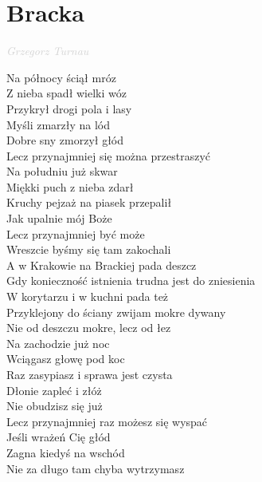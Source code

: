 \documentclass[a5paper, 10pt]{book}
\begin{document}
\section{Bracka}\textcolor{lightgray}{\textit{Grzegorz Turnau}}\\
\begin{minipage}[t]{0.8\textwidth}
Na północy ściął mróz\\
Z nieba spadł wielki wóz\\
Przykrył drogi pola i lasy\\
Myśli zmarzły na lód\\
Dobre sny zmorzył głód\\
Lecz przynajmniej się można przestraszyć\vspace*{2mm}\\
Na południu już skwar\\
Miękki puch z nieba zdarł\\
Kruchy pejzaż na piasek przepalił\\
Jak upalnie mój Boże\\
Lecz przynajmniej być może\\
Wreszcie byśmy się tam zakochali\vspace*{2mm}\\
\hspace*{5mm}A w Krakowie na Brackiej pada deszcz\\
\hspace*{5mm}Gdy konieczność istnienia trudna jest do zniesienia\\
\hspace*{5mm}W korytarzu i w kuchni pada też\\
\hspace*{5mm}Przyklejony do ściany zwijam mokre dywany\\
\hspace*{5mm}Nie od deszczu mokre, lecz od łez\vspace*{2mm}\\
Na zachodzie już noc\\
Wciągasz głowę pod koc\\
Raz zasypiasz i sprawa jest czysta\\
Dłonie zapleć i złóż\\
Nie obudzisz się już\\
Lecz przynajmniej raz możesz się wyspać\vspace*{2mm}\\
Jeśli wrażeń Cię głód\\
Zagna kiedyś na wschód\\
Nie za długo tam chyba wytrzymasz\\

\end{minipage}
\end{document}
